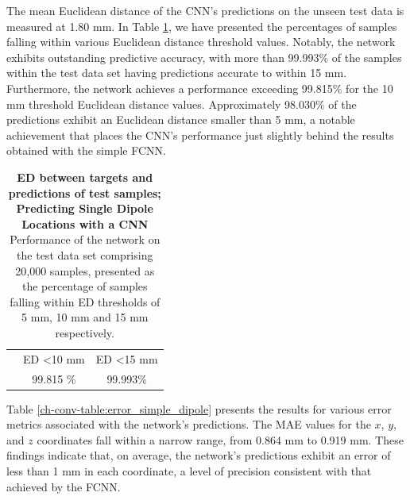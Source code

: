 \documentclass[a4paper, UKenglish, 11pt]{uiomaster}
\begin{document}
The mean Euclidean distance of the CNN's predictions on the unseen test data is measured at 1.80 mm. In Table \ref{ch-conv-table:MED}, we have presented the percentages of samples falling within various Euclidean distance threshold values. Notably, the network exhibits outstanding predictive accuracy, with more than 99.993$\%$ of the samples within the test data set having predictions accurate to within 15 mm. Furthermore, the network achieves a performance exceeding 99.815$\%$ for the 10 mm threshold Euclidean distance values. Approximately 98.030$\%$ of the predictions exhibit an Euclidean distance smaller than 5 mm, a notable achievement that places the CNN's performance just slightly behind the results obtained with the simple FCNN.


\begin{table}[]
  \centering
\begin{tabular}{|ccc|}
\hline
\rowcolor[HTML]{CBCEFB}
\multicolumn{3}{|c|}{\cellcolor[HTML]{CBCEFB}\textbf{Euclidean Distance for Test Samples}}                                                             \\ \hline
\rowcolor[HTML]{EFEFEF}
\multicolumn{1}{|c|}{\cellcolor[HTML]{EFEFEF}ED \textless 5 mm} & \multicolumn{1}{c|}{\cellcolor[HTML]{EFEFEF}ED \textless 10 mm} & ED \textless 15 mm \\ \hline
\rowcolor[HTML]{FFFFFF}
\multicolumn{1}{|c|}{\cellcolor[HTML]{FFFFFF}98.030 $\%$}       & \multicolumn{1}{c|}{\cellcolor[HTML]{FFFFFF}99.815 $\%$}        & 99.993$\%$        \\ \hline
\end{tabular}
\caption{\textbf{ED between targets and predictions of test samples; Predicting Single Dipole Locations with a CNN} \newline
Performance of the network on the test data set comprising 20,000 samples, presented as the percentage of samples falling within ED thresholds of 5 mm, 10 mm and 15 mm respectively.}
\label{ch-conv-table:MED}
\end{table}

\FloatBarrier


Table \ref{ch-conv-table:error_simple_dipole} presents the results for various error metrics associated with the network's predictions. The MAE values for the $x$, $y$, and $z$ coordinates fall within a narrow range, from 0.864 mm to 0.919 mm. These findings indicate that, on average, the network's predictions exhibit an error of less than 1 mm in each coordinate, a level of precision consistent with that achieved by the FCNN.
\end{document}
